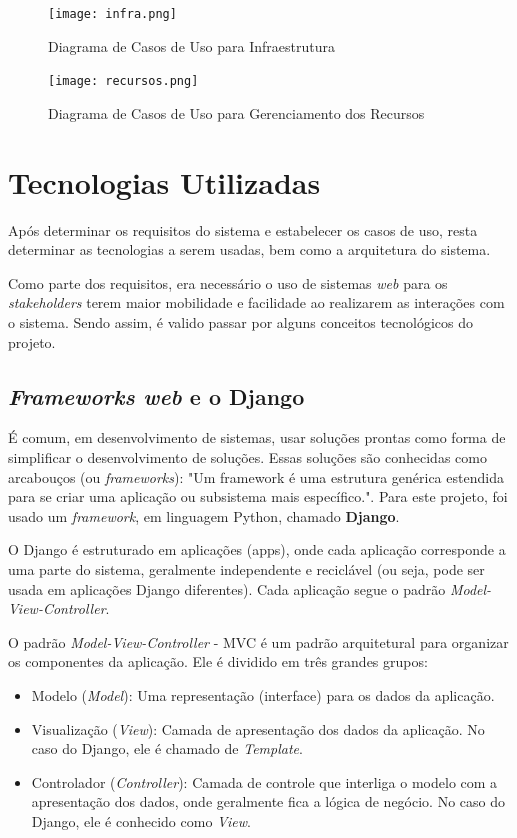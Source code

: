 \begin{figure}[H]
    \centering
    \texttt{[image: infra.png]}
    \caption{Diagrama de Casos de Uso para Infraestrutura}
    \label{fig:use-case-atv}
\end{figure}

\begin{figure}[H]
    \centering
    \texttt{[image: recursos.png]}
    \caption{Diagrama de Casos de Uso para Gerenciamento dos Recursos}
    \label{fig:use-case-atv}
\end{figure}

\section{Tecnologias Utilizadas}
Após determinar os requisitos do sistema e estabelecer os casos de uso, resta determinar as tecnologias a serem usadas, bem como a arquitetura do sistema.

Como parte dos requisitos, era necessário o uso de sistemas \textit{web} para os \textit{stakeholders} terem maior mobilidade e facilidade ao realizarem as interações com o sistema. Sendo assim, é valido passar por alguns conceitos tecnológicos do projeto.

\subsection{\textit{Frameworks web} e o Django}
É comum, em desenvolvimento de sistemas, usar soluções prontas como forma de simplificar o desenvolvimento de soluções. Essas soluções são conhecidas como arcabouços (ou \textit{frameworks})\cite{iansommerville2011}: "Um framework é uma estrutura genérica estendida para se criar uma aplicação ou subsistema mais específico.". Para este projeto, foi usado um \textit{framework}, em linguagem Python, chamado \textbf{Django}.

O Django é estruturado em aplicações (apps), onde cada aplicação corresponde a uma parte do sistema, geralmente independente e reciclável (ou seja, pode ser usada em aplicações Django diferentes). Cada aplicação segue o padrão \textit{Model-View-Controller}.

O padrão \textit{Model-View-Controller} - MVC é um padrão arquitetural para organizar os componentes da aplicação. Ele é dividido em três grandes grupos\cite{thedjangobook2018}:

\begin{itemize}
    \item Modelo (\textit{Model}): Uma representação (interface) para os dados da aplicação.
    \item Visualização (\textit{View}): Camada de apresentação dos dados da aplicação. No caso do Django, ele é chamado de \textit{Template}.
    \item Controlador (\textit{Controller}): Camada de controle que interliga o modelo com a apresentação dos dados, onde geralmente fica a lógica de negócio. No caso do Django, ele é conhecido como \textit{View}.
\end{itemize}

